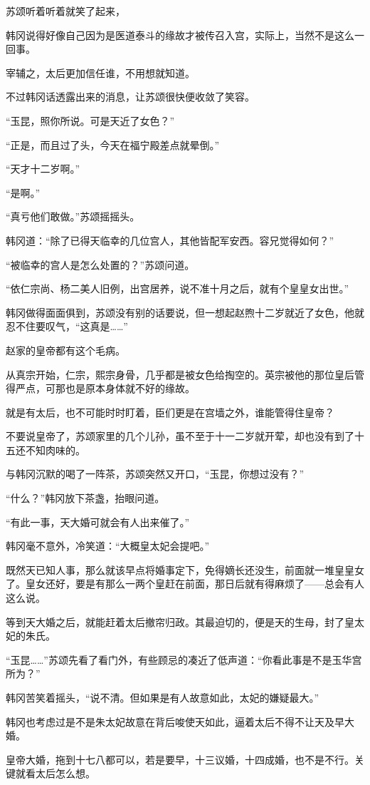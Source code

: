 苏颂听着听着就笑了起来，

韩冈说得好像自己因为是医道泰斗的缘故才被传召入宫，实际上，当然不是这么一回事。

宰辅之，太后更加信任谁，不用想就知道。

不过韩冈话透露出来的消息，让苏颂很快便收敛了笑容。

“玉昆，照你所说。可是天近了女色？”

“正是，而且过了头，今天在福宁殿差点就晕倒。”

“天才十二岁啊。”

“是啊。”

“真亏他们敢做。”苏颂摇摇头。

韩冈道：“除了已得天临幸的几位宫人，其他皆配军安西。容兄觉得如何？”

“被临幸的宫人是怎么处置的？”苏颂问道。

“依仁宗尚、杨二美人旧例，出宫居养，说不准十月之后，就有个皇皇女出世。”

韩冈做得面面俱到，苏颂没有别的话要说，但一想起赵煦十二岁就近了女色，他就忍不住要叹气，“这真是……”

赵家的皇帝都有这个毛病。

从真宗开始，仁宗，熙宗身骨，几乎都是被女色给掏空的。英宗被他的那位皇后管得严点，可那也是原本身体就不好的缘故。

就是有太后，也不可能时时盯着，臣们更是在宫墙之外，谁能管得住皇帝？

不要说皇帝了，苏颂家里的几个儿孙，虽不至于十一二岁就开荤，却也没有到了十五还不知肉味的。

与韩冈沉默的喝了一阵茶，苏颂突然又开口，“玉昆，你想过没有？”

“什么？”韩冈放下茶盏，抬眼问道。

“有此一事，天大婚可就会有人出来催了。”

韩冈毫不意外，冷笑道：“大概皇太妃会提吧。”

既然天已知人事，那么就该早点将婚事定下，免得嫡长还没生，前面就一堆皇皇女了。皇女还好，要是有那么一两个皇赶在前面，那日后就有得麻烦了——总会有人这么说。

等到天大婚之后，就能赶着太后撤帘归政。其最迫切的，便是天的生母，封了皇太妃的朱氏。

“玉昆……”苏颂先看了看门外，有些顾忌的凑近了低声道：“你看此事是不是玉华宫所为？”

韩冈苦笑着摇头，“说不清。但如果是有人故意如此，太妃的嫌疑最大。”

韩冈也考虑过是不是朱太妃故意在背后唆使天如此，逼着太后不得不让天及早大婚。

皇帝大婚，拖到十七八都可以，若是要早，十三议婚，十四成婚，也不是不行。关键就看太后怎么想。

